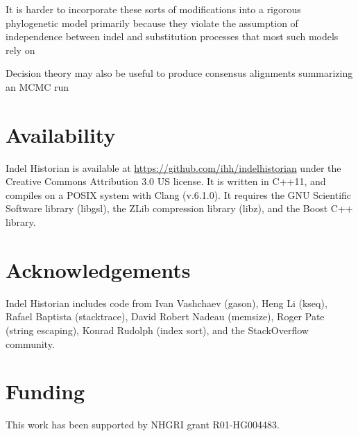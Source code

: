 \documentclass{bioinfo}
\begin{document}
It is harder to incorporate these sorts of modifications into a rigorous phylogenetic model
primarily because they violate the assumption of independence
between indel and substitution processes
that most such models rely on

Decision theory may also be useful to produce consensus alignments summarizing an MCMC run \citep{HermanEtAl2015}



\section{Availability}

Indel Historian is available at \url{https://github.com/ihh/indelhistorian} under the Creative Commons Attribution 3.0 US license. It is written in C++11, and compiles on a POSIX system with Clang (v.6.1.0). It requires the GNU Scientific Software library (libgsl), the ZLib compression library (libz), and the Boost C++ library.

\section*{Acknowledgements}

Indel Historian includes code from Ivan Vashchaev (gason), Heng Li (kseq), Rafael Baptista (stacktrace), David Robert Nadeau (memsize), Roger Pate (string escaping), Konrad Rudolph (index sort), and the StackOverflow community.

\section*{Funding}

This work has been supported by NHGRI grant R01-HG004483.


%
%
%
%
%
%
%
%



\end{document}
